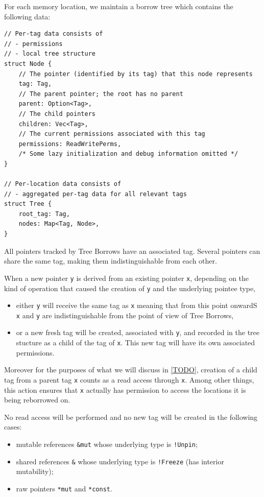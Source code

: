 \documentclass[a4paper,11pt]{article}
\theoremstyle{plain}
\theoremstyle{definition}
\theoremstyle{remark}
\newcommand{\tcode}[1]{\texttt{#1}}
\begin{document}
For each memory location, we maintain a borrow tree which contains
the following data:
\begin{lstlisting}
// Per-tag data consists of
// - permissions
// - local tree structure
struct Node {
    // The pointer (identified by its tag) that this node represents
    tag: Tag,
    // The parent pointer; the root has no parent
    parent: Option<Tag>,
    // The child pointers
    children: Vec<Tag>,
    // The current permissions associated with this tag
    permissions: ReadWritePerms,
    /* Some lazy initialization and debug information omitted */
}

// Per-location data consists of
// - aggregated per-tag data for all relevant tags
struct Tree {
    root_tag: Tag,
    nodes: Map<Tag, Node>,
}
\end{lstlisting}

All pointers tracked by Tree Borrows have an associated tag. Several pointers
can share the same tag, making them indistinguishable from each other.

When a new pointer \tcode{y} is derived from an existing pointer \tcode{x}, depending
on the kind of operation that caused the creation of \tcode{y} and the underlying
pointee type,

\begin{itemize}
    \item either \tcode{y} will receive the same tag as \tcode{x} meaning that from this
        point onwardS \tcode{x} and \tcode{y} are indistinguishable from the point of view of Tree
        Borrows,
    \item or a new fresh tag will be created, associated with \tcode{y}, and recorded in the
        tree stucture as a child of the tag of \tcode{x}. This new tag will have its own
        associated permissions.
\end{itemize}

Moreover for the purposes of what we will discuss in \ref{TODO}, creation of
a child tag from a parent tag \tcode{x} counts as a read access through \tcode{x}.
Among other things, this action ensures that \tcode{x} actually has permission to
access the locations it is being reborrowed on.

No read access will be performed and no new tag will be created in the following
cases:
\begin{itemize}
    \item mutable references \tcode{\&mut} whose underlying type is \tcode{!Unpin};
    \item shared references \tcode{\&} whose underlying type is \tcode{!Freeze} (has interior mutability);
    \item raw pointers \tcode{*mut} and \tcode{*const}.
\end{itemize}
\end{document}
